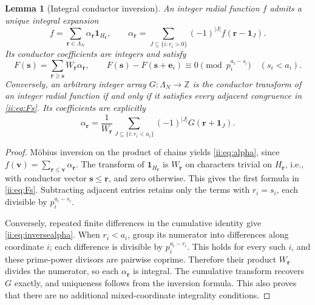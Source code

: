 \documentclass[11pt]{article}
\numberwithin{equation}{section}
\newtheorem{lemma}[theorem]{Lemma}
\theoremstyle{definition}
\theoremstyle{remark}
\newcommand{\s}{\boldsymbol{s}}
\newcommand{\rvec}{\boldsymbol{r}}
\newcommand{\e}{\boldsymbol{e}}
\newcommand{\vv}{\boldsymbol{v}}
\newcommand{\one}{\mathbf 1}
\begin{document}
\begin{lemma}[Integral conductor inversion]\label{ii:lem:integrality}
An integer radial function $f$ admits a unique integral expansion
\begin{equation}\label{ii:eq:alpha}
 f=\sum_{\rvec\in\Lambda_N}\alpha_{\rvec}\one_{H_{\rvec}},\qquad
 \alpha_{\rvec}=\sum_{J\subseteq\{i:r_i>0\}}(-1)^{|J|}f(\rvec-\one_J).
\end{equation}
Its conductor coefficients are integers and satisfy
\begin{equation}\label{ii:eq:Fs}
 F(\s)=\sum_{\rvec\ge\s}W_{\rvec}\alpha_{\rvec},
 \qquad
 F(\s)-F(\s+\e_i)\equiv0\pmod{p_i^{a_i-s_i}}
 \quad(s_i<a_i).
\end{equation}
Conversely, an arbitrary integer array $G:\Lambda_N\to\mathbb Z$ is the conductor transform of an integer radial function if and only if it satisfies every adjacent congruence in \eqref{ii:eq:Fs}.  Its coefficients are explicitly
\begin{equation}\label{ii:eq:inversealpha}
 \alpha_{\rvec}=\frac{1}{W_{\rvec}}
 \sum_{J\subseteq\{i:r_i<a_i\}}(-1)^{|J|}G(\rvec+\one_J).
\end{equation}
\end{lemma}
\begin{proof}
M\"obius inversion on the product of chains yields \eqref{ii:eq:alpha}, since $f(\vv)=\sum_{\rvec\le\vv}\alpha_{\rvec}$.  The transform of $\one_{H_{\rvec}}$ is $W_{\rvec}$ on characters trivial on $H_{\rvec}$, i.e., with conductor vector $\s\le\rvec$, and zero otherwise.  This gives the first formula in \eqref{ii:eq:Fs}.  Subtracting adjacent entries retains only the terms with $r_i=s_i$, each divisible by $p_i^{a_i-s_i}$.

Conversely, repeated finite differences in the cumulative identity give \eqref{ii:eq:inversealpha}.  When $r_i<a_i$, group its numerator into differences along coordinate $i$; each difference is divisible by $p_i^{a_i-r_i}$.  This holds for every such $i$, and these prime-power divisors are pairwise coprime.  Therefore their product $W_{\rvec}$ divides the numerator, so each $\alpha_{\rvec}$ is integral.  The cumulative transform recovers $G$ exactly, and uniqueness follows from the inversion formula.  This also proves that there are no additional mixed-coordinate integrality conditions.\qedhere
\end{proof}
\end{document}
